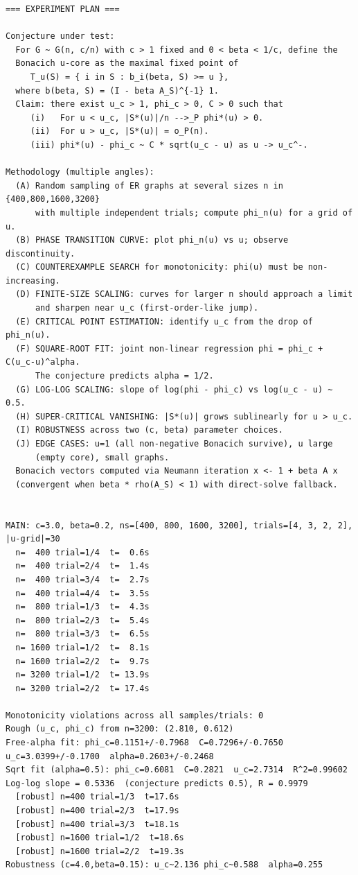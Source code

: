 \documentclass[11pt]{article}
\begin{document}
\begin{lstlisting}
=== EXPERIMENT PLAN ===

Conjecture under test:
  For G ~ G(n, c/n) with c > 1 fixed and 0 < beta < 1/c, define the
  Bonacich u-core as the maximal fixed point of
     T_u(S) = { i in S : b_i(beta, S) >= u },
  where b(beta, S) = (I - beta A_S)^{-1} 1.
  Claim: there exist u_c > 1, phi_c > 0, C > 0 such that
     (i)   For u < u_c, |S*(u)|/n -->_P phi*(u) > 0.
     (ii)  For u > u_c, |S*(u)| = o_P(n).
     (iii) phi*(u) - phi_c ~ C * sqrt(u_c - u) as u -> u_c^-.

Methodology (multiple angles):
  (A) Random sampling of ER graphs at several sizes n in {400,800,1600,3200}
      with multiple independent trials; compute phi_n(u) for a grid of u.
  (B) PHASE TRANSITION CURVE: plot phi_n(u) vs u; observe discontinuity.
  (C) COUNTEREXAMPLE SEARCH for monotonicity: phi(u) must be non-increasing.
  (D) FINITE-SIZE SCALING: curves for larger n should approach a limit
      and sharpen near u_c (first-order-like jump).
  (E) CRITICAL POINT ESTIMATION: identify u_c from the drop of phi_n(u).
  (F) SQUARE-ROOT FIT: joint non-linear regression phi = phi_c + C(u_c-u)^alpha.
      The conjecture predicts alpha = 1/2.
  (G) LOG-LOG SCALING: slope of log(phi - phi_c) vs log(u_c - u) ~ 0.5.
  (H) SUPER-CRITICAL VANISHING: |S*(u)| grows sublinearly for u > u_c.
  (I) ROBUSTNESS across two (c, beta) parameter choices.
  (J) EDGE CASES: u=1 (all non-negative Bonacich survive), u large
      (empty core), small graphs.
  Bonacich vectors computed via Neumann iteration x <- 1 + beta A x
  (convergent when beta * rho(A_S) < 1) with direct-solve fallback.


MAIN: c=3.0, beta=0.2, ns=[400, 800, 1600, 3200], trials=[4, 3, 2, 2], |u-grid|=30
  n=  400 trial=1/4  t=  0.6s
  n=  400 trial=2/4  t=  1.4s
  n=  400 trial=3/4  t=  2.7s
  n=  400 trial=4/4  t=  3.5s
  n=  800 trial=1/3  t=  4.3s
  n=  800 trial=2/3  t=  5.4s
  n=  800 trial=3/3  t=  6.5s
  n= 1600 trial=1/2  t=  8.1s
  n= 1600 trial=2/2  t=  9.7s
  n= 3200 trial=1/2  t= 13.9s
  n= 3200 trial=2/2  t= 17.4s

Monotonicity violations across all samples/trials: 0
Rough (u_c, phi_c) from n=3200: (2.810, 0.612)
Free-alpha fit: phi_c=0.1151+/-0.7968  C=0.7296+/-0.7650  u_c=3.0399+/-0.1700  alpha=0.2603+/-0.2468
Sqrt fit (alpha=0.5): phi_c=0.6081  C=0.2821  u_c=2.7314  R^2=0.99602
Log-log slope = 0.5336  (conjecture predicts 0.5), R = 0.9979
  [robust] n=400 trial=1/3  t=17.6s
  [robust] n=400 trial=2/3  t=17.9s
  [robust] n=400 trial=3/3  t=18.1s
  [robust] n=1600 trial=1/2  t=18.6s
  [robust] n=1600 trial=2/2  t=19.3s
Robustness (c=4.0,beta=0.15): u_c~2.136 phi_c~0.588  alpha=0.255


\end{lstlisting}
\end{document}
